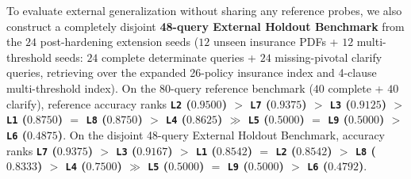 \documentclass[10pt,twocolumn]{article}
\renewcommand{\_}{\textunderscore\allowbreak}
\begin{document}
To evaluate external generalization without sharing any reference probes, we also construct a completely disjoint \textbf{48-query External Holdout Benchmark} from the $24$ post-hardening extension seeds ($12$ unseen insurance PDFs + $12$ multi-threshold seeds: $24$ complete determinate queries + $24$ missing-pivotal clarify queries, retrieving over the expanded 26-policy insurance index and 4-clause multi-threshold index). On the 80-query reference benchmark ($40$ complete + $40$ clarify), reference accuracy ranks \textbf{\texttt{L2} ($0.9500$) $>$ \texttt{L7} ($0.9375$) $>$ \texttt{L3} ($0.9125$) $>$ \texttt{L1} ($0.8750$) $=$ \texttt{L8} ($0.8750$) $>$ \texttt{L4} ($0.8625$) $\gg$ \texttt{L5} ($0.5000$) $=$ \texttt{L9} ($0.5000$) $>$ \texttt{L6} ($0.4875$)}. On the disjoint 48-query External Holdout Benchmark, accuracy ranks \textbf{\texttt{L7} ($0.9375$) $>$ \texttt{L3} ($0.9167$) $>$ \texttt{L1} ($0.8542$) $=$ \texttt{L2} ($0.8542$) $>$ \texttt{L8} ($0.8333$) $>$ \texttt{L4} ($0.7500$) $\gg$ \texttt{L5} ($0.5000$) $=$ \texttt{L9} ($0.5000$) $>$ \texttt{L6} ($0.4792$)}.
\end{document}
